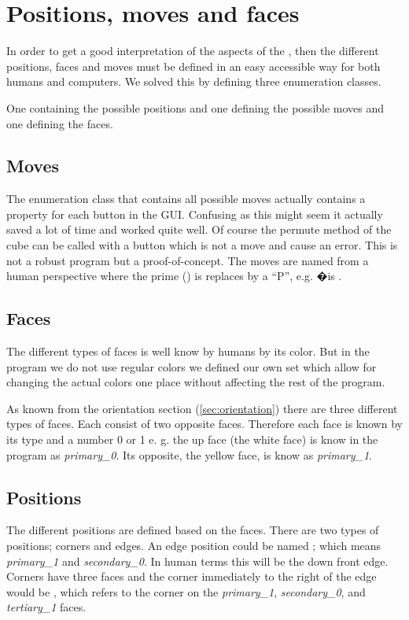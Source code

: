 \section{Positions, moves and faces}
In order to get a good interpretation of the aspects of the \cube{}, then the different positions, faces and moves must be defined in an easy accessible way for both humans and computers. We solved this by defining three enumeration classes. 

One containing the possible positions and one defining the possible moves and one defining the faces.

\subsection{Moves}
The enumeration class that contains all possible moves actually contains a property for each button in the GUI. Confusing as this might seem it actually saved a lot of time and worked quite well. Of course the permute method of the cube can be called with a button which is not a move and cause an error. This is not a robust program but a proof-of-concept. 
The moves are named from a human perspective where the prime () is replaces by a ``P'', e.g. �is .

\subsection{Faces}
The different types of faces is well know by humans by its color.
But in the program we do not use regular colors we defined our own set which allow for changing the actual colors one place without affecting the rest of the program. 

As known from the orientation section (\ref{sec:orientation}) there are three different types of faces.
Each consist of two opposite faces. Therefore each face is known by its type and a number 0 or 1 e. g. the up face (the white face) is know in the program as \textit{primary\_0}.
Its opposite, the yellow face, is know as \textit{primary\_1}. 

\subsection{Positions}
The different positions are defined based on the faces. There are two types of positions; corners and edges.
An edge position could be named ; which means \textit{primary\_1} and \textit{secondary\_0}.
In human terms this will be the down front edge.
Corners have three faces and the corner immediately to the right of the edge would be , which refers to the corner on the \textit{primary\_1}, \textit{secondary\_0}, and \textit{tertiary\_1} faces.
